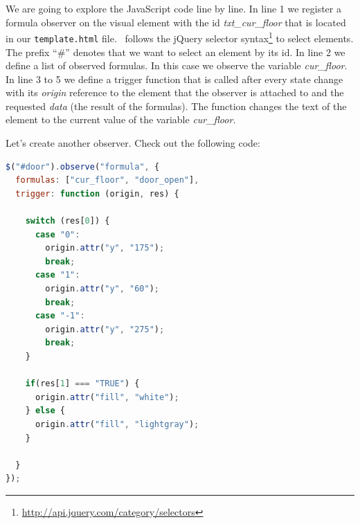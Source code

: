 We are going to explore the JavaScript code line by line.
In line 1 we register a formula observer on the visual element with the id \textit{txt\_cur\_floor} that is located in our \texttt{template.html} file.
\bms~follows the jQuery selector syntax\footnote{\url{http://api.jquery.com/category/selectors}} to select elements.
The prefix ``\#'' denotes that we want to select an element by its id.
In line 2 we define a list of observed formulas.
In this case we observe the variable \textit{cur\_floor}.
In line 3 to 5 we define a trigger function that is called after every state change with its \textit{origin} reference to the element that the observer is attached to and the requested \textit{data} (the result of the formulas).
The function changes the text of the element to the current value of the variable \textit{cur\_floor}.

Let's create another observer.
Check out the following code:

\begin{lstlisting}[language=JavaScript, caption={Formula Observer for the Lift Door (JavaScript)}]
$("#door").observe("formula", {
  formulas: ["cur_floor", "door_open"],
  trigger: function (origin, res) {
    
    switch (res[0]) {
      case "0":
        origin.attr("y", "175");
        break;
      case "1":
        origin.attr("y", "60");
        break;
      case "-1":
        origin.attr("y", "275");
        break;
    }
    
    if(res[1] === "TRUE") {
      origin.attr("fill", "white");
    } else {
      origin.attr("fill", "lightgray");
    }
    
  }
});
\end{lstlisting}

